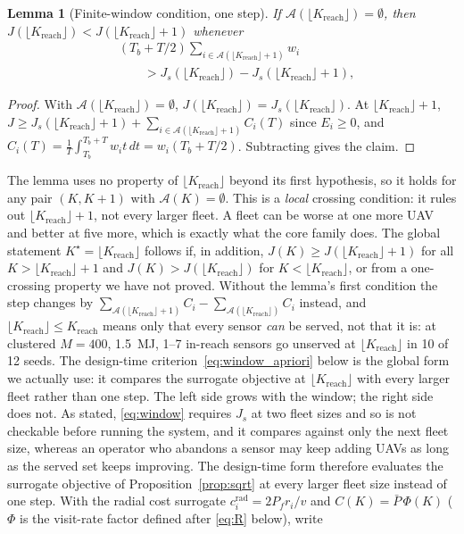 \documentclass[journal,outdir=./]{IEEEtran}
\newtheorem{lemma}{Lemma}
\newcommand{\Kr}{K_{\mathrm{reach}}}
\newcommand{\Pbar}{\bar{P}}
\newcommand{\Pf}{P_{f}}
\begin{document}
\begin{lemma}[Finite-window condition, one step]\label{lem:window}
If $\mathcal{A}(\lfloor\Kr\rfloor)=\emptyset$, then $J(\lfloor\Kr\rfloor)<J(\lfloor\Kr\rfloor+1)$ whenever
\begin{equation}\label{eq:window}
\begin{aligned}
&(T_b+T/2)\sum_{i\in\mathcal{A}(\lfloor\Kr\rfloor+1)}w_i\\
&\qquad>J_s(\lfloor\Kr\rfloor)-J_s(\lfloor\Kr\rfloor+1),
\end{aligned}
\end{equation}
\end{lemma}
\begin{proof}
With $\mathcal{A}(\lfloor\Kr\rfloor)=\emptyset$, $J(\lfloor\Kr\rfloor)=J_s(\lfloor\Kr\rfloor)$. At $\lfloor\Kr\rfloor+1$, $J\ge J_s(\lfloor\Kr\rfloor+1)+\sum_{i\in\mathcal{A}(\lfloor\Kr\rfloor+1)}C_i(T)$ since $E_i\ge0$, and $C_i(T)=\frac1T\int_{T_b}^{T_b+T}w_it\,dt=w_i(T_b+T/2)$. Subtracting gives the claim.
\end{proof}
The lemma uses no property of $\lfloor\Kr\rfloor$ beyond its first hypothesis, so it holds for any pair $(K,K+1)$ with $\mathcal{A}(K)=\emptyset$.
This is a \emph{local} crossing condition: it rules out $\lfloor\Kr\rfloor+1$, not every larger fleet. A fleet can be worse at one more UAV and better at five more, which is exactly what the core family does. The global statement $K^{\star}=\lfloor\Kr\rfloor$ follows if, in addition, $J(K)\ge J(\lfloor\Kr\rfloor+1)$ for all $K>\lfloor\Kr\rfloor+1$ and $J(K)>J(\lfloor\Kr\rfloor)$ for $K<\lfloor\Kr\rfloor$, or from a one-crossing property we have not proved. Without the lemma's first condition the step changes by $\sum_{\mathcal{A}(\lfloor\Kr\rfloor+1)}C_i-\sum_{\mathcal{A}(\lfloor\Kr\rfloor)}C_i$ instead, and $\lfloor\Kr\rfloor\le\Kr$ means only that every sensor \emph{can} be served, not that it is: at clustered $M=400$, 1.5~MJ, 1--7 in-reach sensors go unserved at $\lfloor\Kr\rfloor$ in 10 of 12 seeds. The design-time criterion~\eqref{eq:window_apriori} below is the global form we actually use: it compares the surrogate objective at $\lfloor\Kr\rfloor$ with every larger fleet rather than one step.
The left side grows with the window; the right side does not. As stated, \eqref{eq:window} requires $J_s$ at two fleet sizes and so is not checkable before running the system, and it compares against only the next fleet size, whereas an operator who abandons a sensor may keep adding UAVs as long as the served set keeps improving. The design-time form therefore evaluates the surrogate objective of Proposition~\ref{prop:sqrt} at every larger fleet size instead of one step. With the radial cost surrogate $c_i^{\mathrm{rad}}=2\Pf r_i/v$ and $C(K)=\Pbar\,\Phi(K)$ ($\Phi$ is the visit-rate factor defined after \eqref{eq:R} below), write
\end{document}
